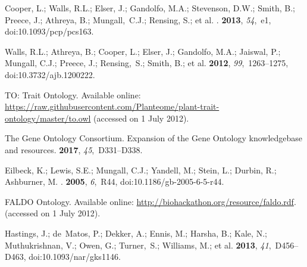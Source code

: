 \documentclass[applsci,article,accept,moreauthors,pdftex]{Definitions/mdpi}
\begin{document}
{\begin{thebibliography}{999}
{
Cooper, L.; Walls, R.L.; Elser, J.; Gandolfo, M.A.; Stevenson, D.W.; Smith, B.;
  Preece, J.; Athreya, B.; Mungall,~C.J.; Rensing, S.; et al.
.
 {\bf 2013}, {\em 54},~e1, doi:10.1093/pcp/pcs163.

Walls, R.L.; Athreya, B.; Cooper, L.; Elser, J.; Gandolfo, M.A.; Jaiswal, P.;
  Mungall, C.J.; Preece, J.; Rensing,~S.; Smith, B.; et al.
 {\bf 2012}, {\em 99},~1263--1275, doi:10.3732/ajb.1200222.

TO: Trait Ontology.
\newblock
 Available online:  \url{https://raw.githubusercontent.com/Planteome/plant-trait-ontology/master/to.owl}
\newblock  (accessed on 1 July 2012).

The Gene Ontology Consortium.
\newblock Expansion of the Gene Ontology knowledgebase and resources.
 {\bf 2017}, {\em 45},~D331--D338.

Eilbeck, K.; Lewis, S.E.; Mungall, C.J.; Yandell, M.; Stein, L.; Durbin, R.;
  Ashburner, M.
.
 {\bf 2005}, {\em 6},~R44, doi:10.1186/gb-2005-6-5-r44.

{FALDO Ontology}.
\newblock Available online:  \url{http://biohackathon.org/resource/faldo.rdf}.
\newblock  (accessed on 1 July 2012).

Hastings, J.; de~Matos, P.; Dekker, A.; Ennis, M.; Harsha, B.; Kale, N.;
  Muthukrishnan, V.; Owen, G.; Turner,~S.; Williams, M.; et al.
 {\bf 2013}, {\em 41},~D456--D463, doi:10.1093/nar/gks1146.

}
\end{thebibliography}}
\end{document}
